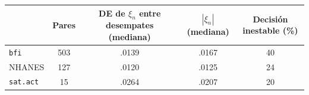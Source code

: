 \begin{tabular}{lcccc}
\toprule
 & Pares & DE de $\xi_n$ entre desempates (mediana) & $|\xi_n|$ (mediana) & Decisi\'on inestable (\%) \\
\midrule
\texttt{bfi} & 503 & .0139 & .0167 & 40 \\
NHANES & 127 & .0120 & .0125 & 24 \\
\texttt{sat.act} & 15 & .0264 & .0207 & 20 \\
\bottomrule
\end{tabular}
